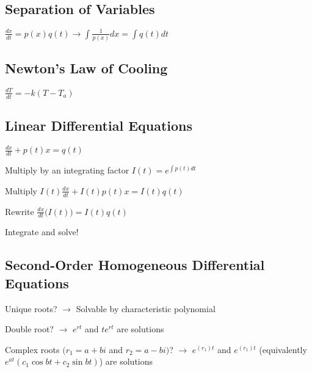 \begin{multicols}{2}

\subsection{Separation of Variables}

\begin{center}

$\displaystyle{\frac{dx}{dt}} = p(x)q(t) \rightarrow \displaystyle{\int \frac{1}{p(x)} dx} = \displaystyle{\int q(t)dt}$

\end{center}

\subsection{Newton's Law of Cooling}

\begin{center}

$\displaystyle{\frac{dT}{dt}} = -k(T-T_{a})$

\end{center}

\end{multicols}

\subsection{Linear Differential Equations}

$\frac{dx}{dt} + p(t)x = q(t)$

Multiply by an integrating factor $I(t) = \displaystyle{e^{\int{p(t)}dt}}$

Multiply $I(t)\displaystyle{\frac{dx}{dt} + I(t)p(t)x = I(t)q(t)}$

Rewrite $\displaystyle{\frac{dx}{dt} \Big( I(t) \Big) } = I(t)q(t)$

Integrate and solve!

\subsection{Second-Order Homogeneous Differential Equations}

Unique roots? $\rightarrow$ Solvable by characteristic polynomial

Double root? $\rightarrow$ $e^{rt}$ and $te^{rt}$ are solutions

Complex roots $(r_{1}=a+bi$ and $r_{2}=a-bi)$? $\rightarrow$ $e^{(r_{1})t}$ and $e^{(r_{1})t}$ (equivalently $e^{at}(c_{1}\cos{bt} + c_{2}\sin{bt})$) are solutions


